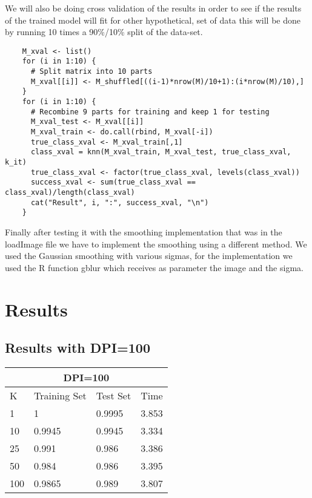 \documentclass[paper=a4, fontsize=11pt]{scrartcl} %
\numberwithin{equation}{section} %
\numberwithin{figure}{section} %
\numberwithin{table}{section} %
\begin{document}
\begin{flushleft}
We will also be doing cross validation of the results in order to see if the results of the trained model will fit for other hypothetical, set of data this will be done by running 10 times a 90\%/10\% split of the data-set.  
\end{flushleft}
\begin{lstlisting}
    M_xval <- list()
    for (i in 1:10) {
      # Split matrix into 10 parts
      M_xval[[i]] <- M_shuffled[((i-1)*nrow(M)/10+1):(i*nrow(M)/10),]
    }
    for (i in 1:10) {
      # Recombine 9 parts for training and keep 1 for testing
      M_xval_test <- M_xval[[i]]
      M_xval_train <- do.call(rbind, M_xval[-i])
      true_class_xval <- M_xval_train[,1]
      class_xval = knn(M_xval_train, M_xval_test, true_class_xval, k_it)
      true_class_xval <- factor(true_class_xval, levels(class_xval))
      success_xval <- sum(true_class_xval == class_xval)/length(class_xval)
      cat("Result", i, ":", success_xval, "\n")
    }
\end{lstlisting}

\begin{flushleft}
Finally after testing it with the smoothing implementation that was in the loadImage file we have to implement the smoothing using a different method. We used the Gaussian smoothing with various sigmas, for the implementation we used the R function gblur which receives as parameter the image and the sigma.   
\end{flushleft}



\section*{Results}

\subsection*{Results with DPI=100}
\begin{tabular}{ |p{3cm}|p{3cm}|p{3cm}|p{3cm}|  }
 \hline
 \multicolumn{4}{|c|}{DPI=100} \\
 \hline
 K & Training Set & Test Set & Time\\
 \hline
 1 & 1 & 0.9995 & 3.853\\
 10 & 0.9945 & 0.9945 & 3.334\\
 25 & 0.991 & 0.986 & 3.386\\
 50 & 0.984 & 0.986 & 3.395\\
 100 & 0.9865 & 0.989 & 3.807\\
 \hline
\end{tabular}
\end{document}
